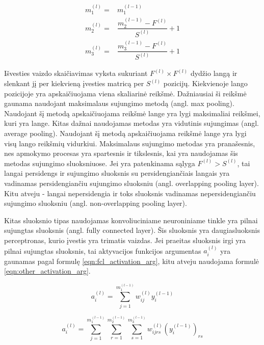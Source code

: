 \begin{equation}
\label{eqn:pool_layer_dims}
	\begin{split}
		m_1^{(l)} = & m_1^{(l-1)} \\
		m_2^{(l)} = & \dfrac{m_2^{(l-1)} - F^{(l)}}{S^{(l)}} + 1 \\
		m_3^{(l)} = & \dfrac{m_3^{(l-1)} - F^{(l)}}{S^{(l)}} + 1
	\end{split}
\end{equation}

Išvesties vaizdo skaičiavimas vyksta sukuriant $ F^{(l)} \times  F^{(l)}$ dydžio langą ir slenkant jį per kiekvieną įvesties matricą per $S^{(l)}$ pozicijų. Kiekvienoje lango pozicijoje yra apskaičiuojama viena skaliarinė reikšmė. Dažniausiai ši reikšmė gaunama naudojant maksimalaus sujungimo metodą (angl. max pooling). Naudojant šį metodą apskaičiuojama reikšmė lange yra lygi maksimaliai reikšmei, kuri yra lange. Kitas dažnai naudojamas metodas yra vidutinis sujungimas (angl. average pooling). Naudojant šį metodą apskaičiuojama reikšmė lange yra lygi visų lango reikšmių vidurkiui. Maksimalaus sujungimo metodas yra pranašesnis, nes apmokymo procesas yra spartesnis ir tikslesnis, kai yra naudojamas šis metodas sujungimo sluoksniuose. Jei yra patenkinama sąlyga $F^{(l)} > S^{(l)}$, tai langai persidengs ir sujungimo sluoksnis su persidengiančiais langais yra vadinamas persidengiančiu sujungimo sluoksniu (angl. overlapping pooling layer). Kitu atveju - langai nepersidengia ir toks sluoksnis vadinamas nepersidengiančiu sujungimo sluoksniu (angl. non-overlapping pooling layer).

Kitas sluoksnio tipas naudojamas konvoliuciniame neuroniniame tinkle yra pilnai sujungtas sluoksnis (angl. fully connected layer). Šis sluoksnis yra daugiasluoksnis perceptronas, kurio įvestis yra trimatis vaizdas. Jei praeitas sluoksnis irgi yra pilnai sujungtas sluoksnis, tai aktyvacijos funkcijos argumentas $a_i^{(l)}$ yra gaunamas pagal formulę \ref{eqn:fcl_activation_arg}, kitu atveju naudojama formulė \ref{eqn:other_activation_arg}.


\begin{equation}
\label{eqn:fcl_activation_arg}
	a_i^{(l)} = \sum_{j = 1}^{m_1^{(l-1)}} w_{ij}^{(l)}y_i^{(l-1)}
\end{equation}

\begin{equation}
\label{eqn:other_activation_arg}
	a_i^{(l)} = \sum_{j = 1}^{m_1^{(l-1)}} \sum_{r = 1}^{m_2^{(l-1)}} \sum_{s = 1}^{m_3^{(l-1)}} w_{ijrs}^{(l)} (y_i^{(l-1)})_{rs}
\end{equation}

